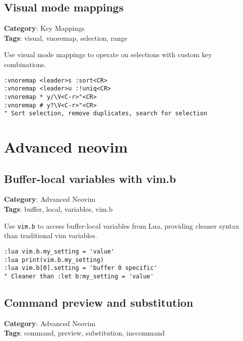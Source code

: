 \section{Visual mode mappings}

\textbf{Category}: Key Mappings\\ \textbf{Tags}: visual, vnoremap, selection, range
\vspace{0.5cm}

Use visual mode mappings to operate on selections with custom key combinations.

\begin{Exa*}{}
\begin{Verbatim}[fontsize=\footnotesize, breaklines, breakanywhere]
:vnoremap <leader>s :sort<CR>
:vnoremap <leader>u :!uniq<CR>
:vnoremap * y/\V<C-r>"<CR>
:vnoremap # y?\V<C-r>"<CR>
" Sort selection, remove duplicates, search for selection
\end{Verbatim}
\end{Exa*}

\chapter{Advanced neovim}
\section{Buffer-local variables with vim.b}

\textbf{Category}: Advanced Neovim\\ \textbf{Tags}: buffer, local, variables, vim.b
\vspace{0.5cm}

Use {\footnotesize \Verb§vim.b§} to access buffer-local variables from Lua, providing cleaner syntax than traditional vim variables.

\begin{Exa*}{}
\begin{Verbatim}[fontsize=\footnotesize, breaklines, breakanywhere]
:lua vim.b.my_setting = 'value'
:lua print(vim.b.my_setting)
:lua vim.b[0].setting = 'buffer 0 specific'
" Cleaner than :let b:my_setting = 'value'
\end{Verbatim}
\end{Exa*}

\section{Command preview and substitution}

\textbf{Category}: Advanced Neovim\\ \textbf{Tags}: command, preview, substitution, inccommand
\vspace{0.5cm}

